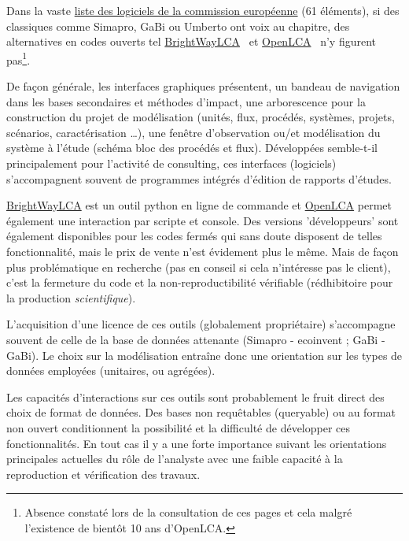 Dans la vaste \href{http://eplca.jrc.ec.europa.eu/ResourceDirectory/faces/tools/toolList.xhtml}{liste des logiciels de la commission européenne} (61 éléments), si des classiques comme Simapro, GaBi ou Umberto ont voix au chapitre, des alternatives en codes ouverts tel \href{http://brightwaylca.org/}{BrightWayLCA}~\cite{mutel_brightway2_2012} et \href{http://www.openlca.org/}{OpenLCA}~\cite{ciroth_ict_2007} n'y figurent pas\footnote{Absence constaté lors de la consultation de ces pages et cela malgré l’existence de bientôt 10 ans d'OpenLCA.}.

De façon générale, les interfaces graphiques présentent, un bandeau de navigation dans les bases secondaires et méthodes d'impact, une arborescence pour la construction du projet de modélisation (unités, flux, procédés, systèmes, projets, scénarios, caractérisation \ldots), une fenêtre d'observation ou/et modélisation du système à l'étude (schéma bloc des procédés et flux).
Développées semble-t-il principalement pour l'activité de consulting, ces interfaces (logiciels) s'accompagnent souvent de programmes intégrés d'édition de rapports d'études.

\href{http://brightwaylca.org/}{BrightWayLCA} est un outil python en ligne de commande et \href{http://www.openlca.org/}{OpenLCA} permet également une interaction par scripte et console.
Des versions 'développeurs' sont également disponibles pour les codes fermés qui sans doute disposent de telles fonctionnalité, mais le prix de vente n'est évidement plus le même.
Mais de façon plus problématique en recherche (pas en conseil si cela n'intéresse pas le client), c'est la fermeture du code et la non-reproductibilité vérifiable (rédhibitoire pour la production \emph{scientifique}).

L'acquisition d'une licence de ces outils (globalement propriétaire) s'accompagne souvent de celle de la base de données attenante (Simapro - ecoinvent ; GaBi - GaBi).
Le choix sur la modélisation entraîne donc une orientation sur les types de données employées (unitaires, ou agrégées).

Les capacités d'interactions sur ces outils sont probablement le fruit direct des choix de format de données.
Des bases non requêtables (queryable) ou au format non ouvert conditionnent la possibilité et la difficulté de développer ces fonctionnalités.
En tout cas il y a une forte importance suivant les orientations principales actuelles du rôle de l'analyste avec une faible capacité à la reproduction et vérification des travaux.
